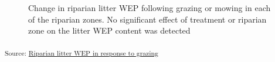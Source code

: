 \documentclass[
]{agujournal2019}
\begin{document}
\begin{figure}[H]


\caption{\label{fig-litter-wep}Change in riparian litter WEP following
grazing or mowing in each of the riparian zones. No significant effect
of treatment or riparian zone on the litter WEP content was detected}

\end{figure}%

\textsubscript{Source:
\href{https://alex-koiter.github.io/riparian-grazing-manuscript/notebooks/02_Litter_analysis-preview.html\#cell-fig-litter-WEP}{Riparian
litter WEP in response to grazing}}
\end{document}
